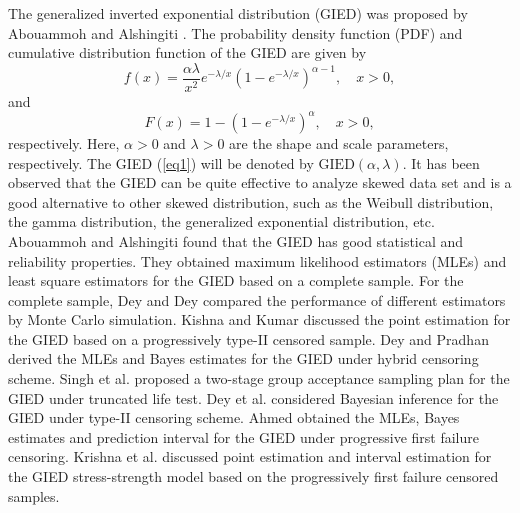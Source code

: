 \documentclass[12pt]{article}
\begin{document}
The generalized inverted exponential distribution (GIED) was proposed by Abouammoh and Alshingiti \cite{abouammoh2009reliability}. The probability density function (PDF) and cumulative distribution function of the GIED are given by
\begin{equation}\label{eq2}
f(x)=\frac{\alpha\lambda}{x^2}e^{-\lambda/x}(1-e^{-\lambda/x})^{\alpha-1}, \quad   x>0,
\end{equation}
and
\begin{equation}\label{eq1}
F(x)=1-(1-e^{-\lambda/x})^\alpha,  \quad   x>0,
\end{equation}
respectively. Here, $\alpha>0$ and $\lambda>0$ are the shape and scale parameters, respectively. The GIED (\ref{eq1}) will be denoted by $\mbox{GIED}(\alpha,\lambda)$. It has been observed that the GIED can be quite effective to analyze skewed data set and is a good alternative to other skewed distribution, such as the Weibull distribution, the gamma distribution, the generalized exponential distribution, etc.
Abouammoh and Alshingiti \cite{abouammoh2009reliability} found that the GIED has good statistical and reliability properties. They obtained maximum likelihood estimators (MLEs) and least square estimators for the GIED based on a complete sample. For the complete sample, Dey and Dey \cite{dey2014generalized2} compared the performance of different estimators by Monte Carlo simulation. Kishna and Kumar \cite{krishna2013reliability} discussed the point estimation for the GIED based on a progressively type-II censored sample. Dey and Pradhan \cite{dey2014generalized1} derived the MLEs and Bayes estimates for the GIED under hybrid censoring scheme. Singh et al. \cite{singh2015sampling} proposed a two-stage group acceptance sampling plan for the GIED under truncated life test. Dey et al. \cite{dey2016bayesian} considered Bayesian inference for the GIED under type-II censoring scheme.
Ahmed \cite{ahmed2017estimation} obtained the MLEs, Bayes estimates and prediction interval for the GIED under progressive first failure censoring.
Krishna et al. \cite{krishna2017estimation} discussed point estimation and interval estimation for the GIED stress-strength model based on the progressively first failure censored samples. %
\end{document}
